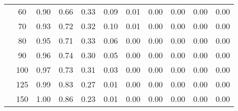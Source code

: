 \begin{table}[t]
\begin{center}
\begin{subtable}[c]{\textwidth}
\begin{center}
\begin{tabular}{rcccccccccc}
                                        & \multicolumn{1}{c|}{60}  & \num{0.90}  & \num{0.66}  & \num{0.33}  & \num{0.09}  & \num{0.01}  & \num{0.00}  & \num{0.00}  & \num{0.00}  & \num{0.00}  \\
                                        & \multicolumn{1}{c|}{70}  & \num{0.93}  & \num{0.72}  & \num{0.32}  & \num{0.10}  & \num{0.01}  & \num{0.00}  & \num{0.00}  & \num{0.00}  & \num{0.00}  \\
                                        & \multicolumn{1}{c|}{80}  & \num{0.95}  & \num{0.71}  & \num{0.33}  & \num{0.06}  & \num{0.00}  & \num{0.00}  & \num{0.00}  & \num{0.00}  & \num{0.00}  \\
                                        & \multicolumn{1}{c|}{90}  & \num{0.96}  & \num{0.74}  & \num{0.30}  & \num{0.05}  & \num{0.00}  & \num{0.00}  & \num{0.00}  & \num{0.00}  & \num{0.00}  \\
                                        & \multicolumn{1}{c|}{100}  & \num{0.97}  & \num{0.73}  & \num{0.31}  & \num{0.03}  & \num{0.00}  & \num{0.00}  & \num{0.00}  & \num{0.00}  & \num{0.00}  \\
                                        & \multicolumn{1}{c|}{125}  & \num{0.99}  & \num{0.83}  & \num{0.27}  & \num{0.01}  & \num{0.00}  & \num{0.00}  & \num{0.00}  & \num{0.00}  & \num{0.00}  \\
                                        & \multicolumn{1}{c|}{150}  & \num{1.00}  & \num{0.86}  & \num{0.23}  & \num{0.01}  & \num{0.00}  & \num{0.00}  & \num{0.00}  & \num{0.00}  & \num{0.00}  \\
                                    \end{tabular}
            \end{center}
        \end{subtable}

        \vspace{5mm}


\end{center}
\end{table}
